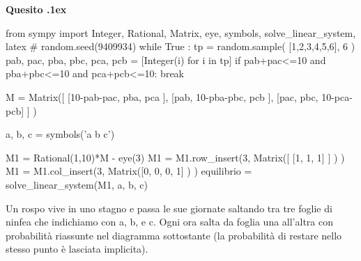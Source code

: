 \documentclass[11pt,twoside,a4paper]{article}
\newcounter{quesito}
\newenvironment{xquestion}{\bigskip\addtocounter{quesito}{1}\bigskip\bigskip\par\textbf{Quesito \thequesito.\kern1ex}}{\vspace{\parskip}}
\begin{document}
\begin{xquestion}
\def\Pr{{\rm Pr\,}}
\def\pyl#1{\py{latex(#1) } }
\everymath{\displaystyle}
\def\nicefrac#1#2{#1/#2}
\renewcommand{\arraystretch}{1.3}
\begin{pycode}
from sympy import  Integer, Rational, Matrix, eye, symbols, solve_linear_system, latex
# random.seed(9409934)
while True :
    tp  =  random.sample( [1,2,3,4,5,6], 6 ) 
    pab, pac, pba, pbc, pca, pcb = [Integer(i) for i in tp] 
    if pab+pac<=10 and pba+pbc<=10 and pca+pcb<=10: break
    
M = Matrix([  [10-pab-pac, pba,        pca       ],
              [pab,         10-pba-pbc, pcb      ],
              [pac,         pbc,        10-pca-pcb] ] )
    
a, b, c = symbols('a b c')

M1 = Rational(1,10)*M - eye(3)
M1 = M1.row_insert(3, Matrix([ [1, 1, 1] ] ) )
M1 = M1.col_insert(3, Matrix([0, 0, 0, 1] ) )
equilibrio = solve_linear_system(M1, a, b, c)

\end{pycode}
Un rospo vive in uno stagno e passa le sue giornate saltando tra tre foglie di ninfea 
che indichiamo con {\sf a}, {\sf b}, e {\sf c}. Ogni ora salta da foglia una all'altra 
con probabilità riassunte nel diagramma sottostante (la probabilità di restare nello 
stesso punto è lasciata implicita). 

\hfil
{}


\end{xquestion}
\end{document}
